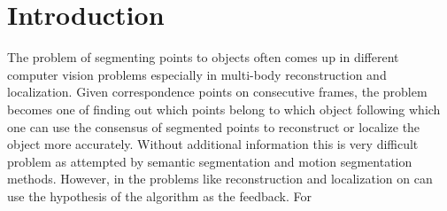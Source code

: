 \section{Introduction}
The problem of segmenting points to objects often comes up in different
computer vision problems especially in multi-body 
reconstruction and localization. Given correspondence points on
consecutive frames, the problem becomes one of finding out which points belong
to which object following which one can use the consensus of segmented points
to reconstruct or localize the object more accurately. Without additional 
information this is very difficult problem as attempted by semantic segmentation 
and motion segmentation methods. However, in the problems like reconstruction and
localization on can use the hypothesis of the algorithm as the feedback. For
